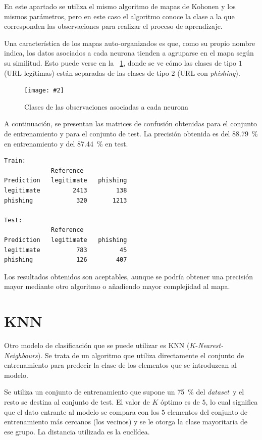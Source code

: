 \documentclass[12pt, a4paper]{article}
\renewcommand{\textit}{\textsl}
\newcommand*{\figref}[1]{\figurename~\ref{fig:#1}}
\newcommand{\figcaption}[4][H]{
  \begin{figure}[#1]
    \centering
    \texttt{[image: \#2]}
    \caption{#3}
    \label{fig:#2}
  \end{figure}
}
\newcommand*{\dataset}{\textit{dataset}}
\newcommand*{\phishing}{\textit{phishing}}
\begin{document}
      En este apartado se utiliza el mismo algoritmo de mapas de Kohonen y los mismos parámetros, pero en este caso el algoritmo conoce la clase a la que corresponden las observaciones para realizar el proceso de aprendizaje.

      Una característica de los mapas auto-organizados es que, como su propio nombre indica, los datos asociados a cada neurona tienden a agruparse en el mapa según su similitud. Esto puede verse en la \figref{classes_som.png}, donde se ve cómo las clases de tipo $1$ (URL legítimas) están separadas de las clases de tipo $2$ (URL con \phishing).

      \figcaption{classes_som.png}{Clases de las observaciones asociadas a cada neurona}{1}

      A continuación, se presentan las matrices de confusión obtenidas para el conjunto de entrenamiento y para el conjunto de test. La precisión obtenida es del \SI{88.79}{\percent} en entrenamiento y del \SI{87.44}{\percent} en test.

      \begin{verbatim}
Train:
             Reference
Prediction   legitimate   phishing
legitimate         2413        138
phishing            320       1213

Test:
             Reference
Prediction   legitimate   phishing
legitimate          783         45
phishing            126        407
      \end{verbatim}

      Los resultados obtenidos son aceptables, aunque se podría obtener una precisión mayor mediante otro algoritmo o añadiendo mayor complejidad al mapa.

  \section{KNN}

    Otro modelo de clasificación que se puede utilizar es KNN ($K$-\textit{Nearest-Neighbours}). Se trata de un algoritmo que utiliza directamente el conjunto de entrenamiento para predecir la clase de los elementos que se introduzcan al modelo.

    Se utiliza un conjunto de entrenamiento que supone un \SI{75}{\percent} del \dataset\ y el resto se destina al conjunto de test. El valor de $K$ óptimo es de $5$, lo cual significa que el dato entrante al modelo se compara con los $5$ elementos del conjunto de entrenamiento más cercanos (los vecinos) y se le otorga la clase mayoritaria de ese grupo. La distancia utilizada es la euclídea.
\end{document}
